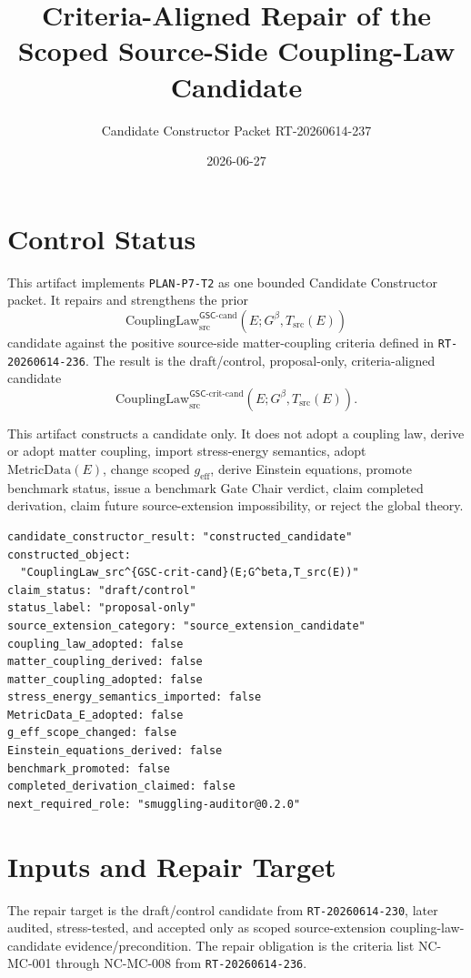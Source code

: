 \documentclass[11pt]{article}
\title{Criteria-Aligned Repair of the Scoped Source-Side Coupling-Law Candidate}
\author{Candidate Constructor Packet RT-20260614-237}
\date{2026-06-27}
\newcommand{\Gbeta}{G^\beta}
\newcommand{\geff}{g_{\mathrm{eff}}}
\newcommand{\CouplingLaw}{\mathrm{CouplingLaw}^{\mathsf{GSC}\mbox{-}\mathrm{cand}}_{\mathrm{src}}}
\newcommand{\CouplingLawCrit}{\mathrm{CouplingLaw}^{\mathsf{GSC}\mbox{-}\mathrm{crit}\mbox{-}\mathrm{cand}}_{\mathrm{src}}}
\newcommand{\MetricData}{\mathrm{MetricData}}
\begin{document}
\maketitle

\section{Control Status}

This artifact implements \texttt{PLAN-P7-T2} as one bounded Candidate
Constructor packet. It repairs and strengthens the prior
\[
  \CouplingLaw(E;\Gbeta,T_{\mathrm{src}}(E))
\]
candidate against the positive source-side matter-coupling criteria defined in
\texttt{RT-20260614-236}. The result is the draft/control,
proposal-only, criteria-aligned candidate
\[
  \CouplingLawCrit(E;\Gbeta,T_{\mathrm{src}}(E)).
\]

This artifact constructs a candidate only. It does not adopt a coupling law,
derive or adopt matter coupling, import stress-energy semantics, adopt
\(\MetricData(E)\), change scoped \(\geff\), derive Einstein equations,
promote benchmark status, issue a benchmark Gate Chair verdict, claim
completed derivation, claim future source-extension impossibility, or reject
the global theory.

\begin{verbatim}
candidate_constructor_result: "constructed_candidate"
constructed_object:
  "CouplingLaw_src^{GSC-crit-cand}(E;G^beta,T_src(E))"
claim_status: "draft/control"
status_label: "proposal-only"
source_extension_category: "source_extension_candidate"
coupling_law_adopted: false
matter_coupling_derived: false
matter_coupling_adopted: false
stress_energy_semantics_imported: false
MetricData_E_adopted: false
g_eff_scope_changed: false
Einstein_equations_derived: false
benchmark_promoted: false
completed_derivation_claimed: false
next_required_role: "smuggling-auditor@0.2.0"
\end{verbatim}

\section{Inputs and Repair Target}

The repair target is the draft/control candidate from \texttt{RT-20260614-230},
later audited, stress-tested, and accepted only as scoped source-extension
coupling-law-candidate evidence/precondition. The repair obligation is the
criteria list NC-MC-001 through NC-MC-008 from \texttt{RT-20260614-236}.
\end{document}
